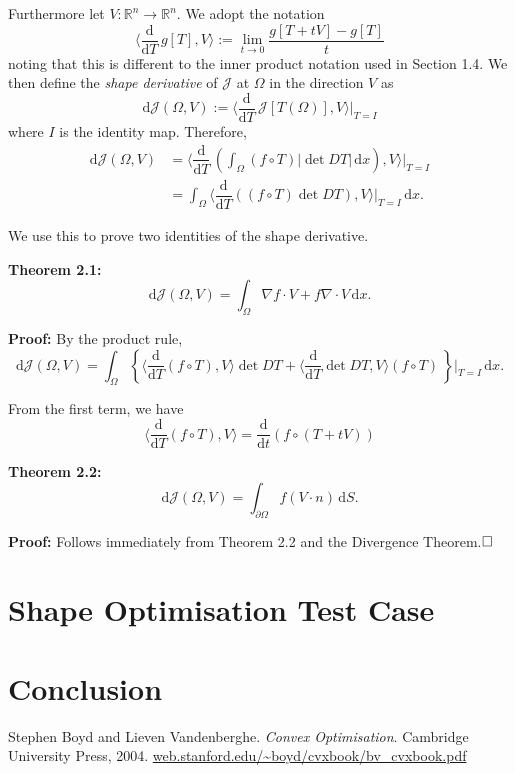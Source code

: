 \documentclass[a4paper,11pt]{article}
\begin{document}
\vspace{3mm}

Furthermore let $V:\mathbb{R}^n\rightarrow \mathbb{R}^n$. We adopt the notation $$\Big\langle \dfrac{\text{d}}{\text{d}T}\,g[T],V\Big\rangle:=\lim_{t\rightarrow 0} \dfrac{g[T+tV]-g[T]}{t}$$ noting that this is different to the inner product notation used in Section 1.4. We then define the \textit{shape derivative} of $\mathcal{J}$ at $\Omega$ in the direction $V$ as $$\text{d}\mathcal{J}(\Omega,V):=\Big\langle\dfrac{\text{d}}{\text{d}T}\,\mathcal{J}[T(\Omega)],V\Big\rangle\Big|_{T=I}$$ where $I$ is the identity map. Therefore,
\begin{align*}
    \text{d}\mathcal{J}(\Omega,V)&=\Big\langle\dfrac{\text{d}}{\text{d}T}\,\left(\int_\Omega (f\circ T)|\det DT|\, \text{d}x\right),V\Big\rangle\Big|_{T=I}\\
    &=\int_\Omega\Big\langle\dfrac{\text{d}}{\text{d}T}( (f\circ T)\det DT),V\Big\rangle\Big|_{T=I}\,\text{d}x.
\end{align*}

We use this to prove two identities of the shape derivative.

\vspace{3mm}

\textbf{Theorem 2.1:} $$ \text{d}\mathcal{J}(\Omega,V)=\int_\Omega \nabla f\cdot V +f \nabla \cdot V\,\text{d}x.$$

\textbf{Proof:} By the product rule,
$$\text{d}\mathcal{J}(\Omega,V)=\int_\Omega\left\{\Big\langle\dfrac{\text{d}}{\text{d}T}( f\circ T),V\Big\rangle\det DT+\Big\langle\dfrac{\text{d}}{\text{d}T} \det DT,V\Big\rangle(f\circ T)\,\right\}\Big|_{T=I}\,\text{d}x.$$

From the first term, we have $$\Big\langle\dfrac{\text{d}}{\text{d}T}( f\circ T),V\Big\rangle=\dfrac{\text{d}}{\text{d}t}(f\circ (T+tV))$$

\newpage

\textbf{Theorem 2.2:} $$\text{d}\mathcal{J}(\Omega,V)=\int_{\partial\Omega} f(V \cdot n)\,\text{d}S.$$

\textbf{Proof:} Follows immediately from Theorem 2.2 and the Divergence Theorem.$\hfill\square$

\newpage

\section{Shape Optimisation Test Case}

\newpage

\section{Conclusion}




\newpage

\begin{thebibliography}{9}

Stephen Boyd and Lieven Vandenberghe. \textit{Convex Optimisation}. Cambridge University Press, 2004. \url{web.stanford.edu/~boyd/cvxbook/bv_cvxbook.pdf}
 
\end{thebibliography}
\end{document}
